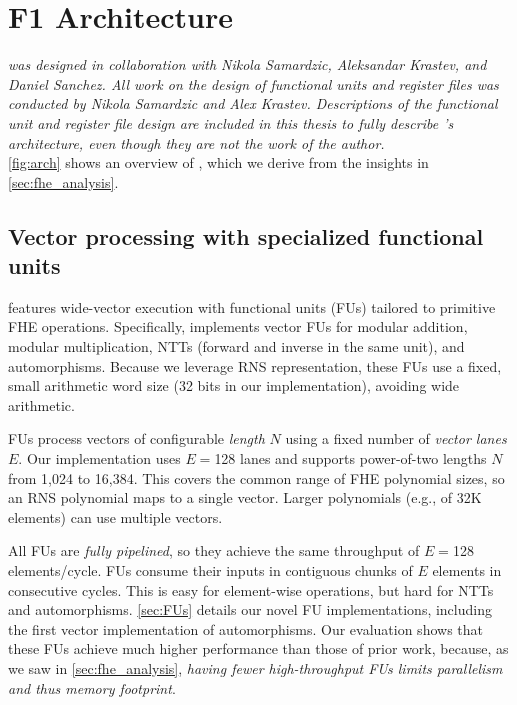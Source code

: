 
\chapter{F1 Architecture}\label{sec:arch}

\emph{\name was designed in collaboration with Nikola Samardzic, Aleksandar Krastev, and Daniel Sanchez. All work on the design of functional units and register files was conducted by Nikola Samardzic and Alex Krastev. Descriptions of the functional unit and register file design are included in this thesis to fully describe \name's architecture, even though they are not the work of the author.}\\

\autoref{fig:arch} shows an overview of \name, which we derive from the insights in \autoref{sec:fhe_analysis}.

\figArch

\section{Vector processing with specialized functional units}

\name features wide-vector execution with functional units (FUs) tailored to 
primitive FHE operations.
Specifically, \name implements vector FUs for modular addition, modular multiplication, NTTs (forward and inverse in the same unit),
and automorphisms.
Because we leverage RNS representation, these FUs use a fixed, small arithmetic word size (32 bits in our implementation),
avoiding wide arithmetic.

FUs process vectors of configurable \emph{length} $N$ using a fixed number of \emph{vector lanes} $E$.
Our implementation uses $E=$128 lanes and supports power-of-two lengths $N$ from 1,024 to 16,384.
This covers the common range of FHE polynomial sizes, so an RNS polynomial maps to a single vector.
Larger polynomials (e.g., of 32K elements) can use multiple vectors.

All FUs are \emph{fully pipelined}, so they achieve the same throughput of $E=$128 elements/cycle.
FUs consume their inputs in contiguous chunks of $E$ elements in consecutive cycles.
This is easy for element-wise operations, but hard for NTTs and automorphisms.
\autoref{sec:FUs} details our novel FU implementations, including the first vector implementation of automorphisms.
Our evaluation shows that these FUs achieve much higher performance than those of prior work,
because, as we saw in \autoref{sec:fhe_analysis},
\emph{having fewer high-throughput FUs limits parallelism and thus memory footprint}.

